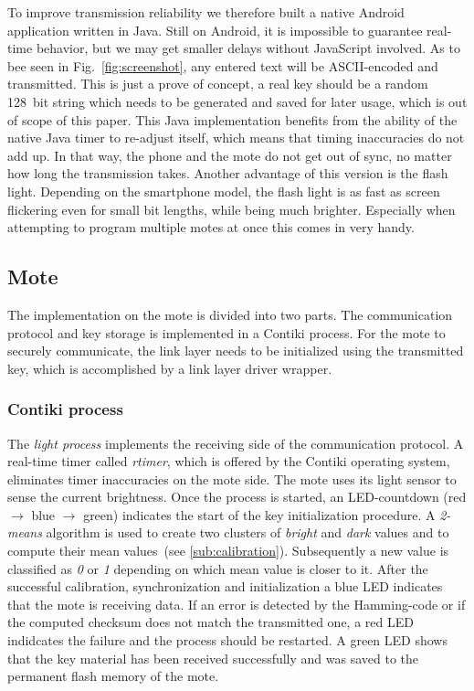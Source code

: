 \documentclass{sig-alternate} %
\begin{document}
To improve transmission reliability we therefore built a native Android application written in Java.
Still on Android, it is impossible to guarantee real-time behavior, but we may get smaller delays without JavaScript involved.
As to bee seen in Fig.~\ref{fig:screenshot}, any entered text will be ASCII-encoded and transmitted.
This is just a prove of concept, a real key should be a random 128~bit string which needs to be generated and saved for later usage, which is out of scope of this paper.
This Java implementation benefits from the ability of the native Java timer to re-adjust itself, which means that timing inaccuracies do not add up.
In that way, the phone and the mote do not get out of sync, no matter how long the transmission takes.
Another advantage of this version is the flash light.
Depending on the smartphone model, the flash light is as fast as screen flickering even for small bit lengths, while being much brighter.
Especially when attempting to program multiple motes at once this comes in very handy.


\subsection{Mote}
\label{sub:mote}

The implementation on the mote is divided into two parts.
The communication protocol and key storage is implemented in a Contiki process.
For the mote to securely communicate, the link layer needs to be initialized using the transmitted key, which is accomplished by a link layer driver wrapper.

\subsubsection{Contiki process}
\label{ssub:contiki_process}

The \textit{light process} implements the receiving side of the communication protocol.
A real-time timer called \textit{rtimer}, which is offered by the Contiki operating system, eliminates timer inaccuracies on the mote side.
The mote uses its light sensor to sense the current brightness.
Once the process is started, an LED-countdown (red $\rightarrow$ blue $\rightarrow$ green) indicates the start of the key initialization procedure.
A \mbox{\textit{2-means}} algorithm is used to create two clusters of \textit{bright} and \textit{dark} values and to compute their mean values~(see \ref{sub:calibration}).
Subsequently a new value is classified as \textit{0} or \textit{1} depending on which mean value is closer to it.
After the successful calibration, synchronization and initialization a blue LED indicates that the mote is receiving data.
If an error is detected by the Hamming-code or if the computed checksum does not match the transmitted one, a red LED indidcates the failure and the process should be restarted.
A green LED shows that the key material has been received successfully and was saved to the permanent flash memory of the mote.
\end{document}
